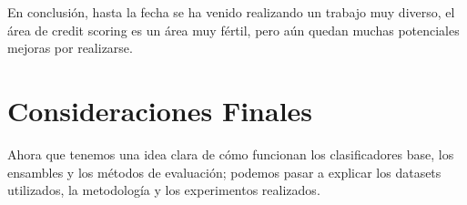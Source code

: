 En conclusión, hasta la fecha se ha venido realizando un trabajo muy diverso, el área de credit scoring es un área muy fértil, pero aún quedan muchas potenciales mejoras por realizarse.

\section{Consideraciones Finales}

Ahora que tenemos una idea clara de cómo funcionan los clasificadores base, los ensambles y los métodos de evaluación; podemos pasar a explicar los datasets utilizados, la metodología y los experimentos realizados.
